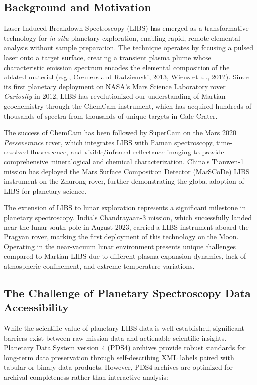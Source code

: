 \documentclass[12pt,a4paper]{article}
\begin{document}
\subsection{Background and Motivation}

Laser-Induced Breakdown Spectroscopy (LIBS) has emerged as a transformative technology for \emph{in situ} planetary exploration, enabling rapid, remote elemental analysis without sample preparation. The technique operates by focusing a pulsed laser onto a target surface, creating a transient plasma plume whose characteristic emission spectrum encodes the elemental composition of the ablated material (e.g., Cremers and Radziemski, 2013; Wiens et al., 2012). Since its first planetary deployment on NASA's Mars Science Laboratory rover \emph{Curiosity} in 2012, LIBS has revolutionized our understanding of Martian geochemistry through the ChemCam instrument, which has acquired hundreds of thousands of spectra from thousands of unique targets in Gale Crater.

The success of ChemCam has been followed by SuperCam on the Mars 2020 \emph{Perseverance} rover, which integrates LIBS with Raman spectroscopy, time-resolved fluorescence, and visible/infrared reflectance imaging to provide comprehensive mineralogical and chemical characterization. China's Tianwen-1 mission has deployed the Mars Surface Composition Detector (MarSCoDe) LIBS instrument on the Zhurong rover, further demonstrating the global adoption of LIBS for planetary science.

The extension of LIBS to lunar exploration represents a significant milestone in planetary spectroscopy. India's Chandrayaan-3 mission, which successfully landed near the lunar south pole in August 2023, carried a LIBS instrument aboard the Pragyan rover, marking the first deployment of this technology on the Moon. Operating in the near-vacuum lunar environment presents unique challenges compared to Martian LIBS due to different plasma expansion dynamics, lack of atmospheric confinement, and extreme temperature variations.

\subsection{The Challenge of Planetary Spectroscopy Data Accessibility}

While the scientific value of planetary LIBS data is well established, significant barriers exist between raw mission data and actionable scientific insights. Planetary Data System version~4 (PDS4) archives provide robust standards for long-term data preservation through self-describing XML labels paired with tabular or binary data products. However, PDS4 archives are optimized for archival completeness rather than interactive analysis:
\end{document}

